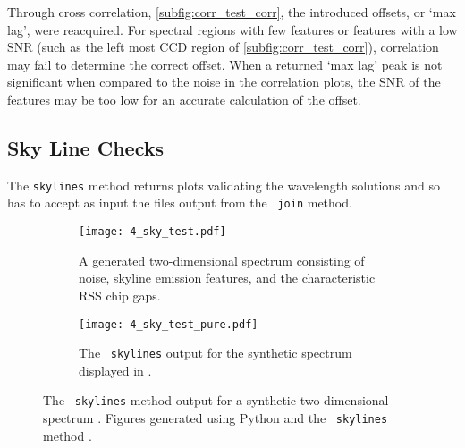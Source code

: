 Through cross correlation, \autoref{subfig:corr_test_corr}, the introduced offsets, or `max lag', were reacquired.
For spectral regions with few features or features with a low \gls{SNR} (such as the left most \gls{CCD} region of \autoref{subfig:corr_test_corr}), correlation may fail to determine the correct offset.
When a returned `max lag' peak is not significant when compared to the noise in the correlation plots, the \gls{SNR} of the features may be too low for an accurate calculation of the offset.

\subsection{Sky Line Checks} \label{subsec:test_sky}

The \texttt{skylines} method returns plots validating the wavelength solutions and so has to accept as input the files output from the \stops\ \texttt{join} method.

\begin{figure}[t]
    \centering
    \begin{subfigure}[b]{1.0 \textwidth}
        \centering
        \texttt{[image: 4\_sky\_test.pdf]}
        \caption{A generated two-dimensional spectrum consisting of noise, skyline emission features, and the characteristic \gls{RSS} chip gaps.}
        \label{subfig:sky_test_spec}
    \end{subfigure}
    \hfill
    \begin{subfigure}[b]{1.0 \textwidth}
        \centering
        \texttt{[image: 4\_sky\_test\_pure.pdf]}
        \caption{The \stops\ \texttt{skylines} output for the synthetic spectrum displayed in .}
        \label{subfig:sky_test_pure}
    \end{subfigure}
    \caption{The \stops\ \texttt{skylines} method output  for a synthetic two-dimensional spectrum . Figures generated using Python  and the \stops\ \texttt{skylines} method .}
    \label{fig:sky_test}
\end{figure}

